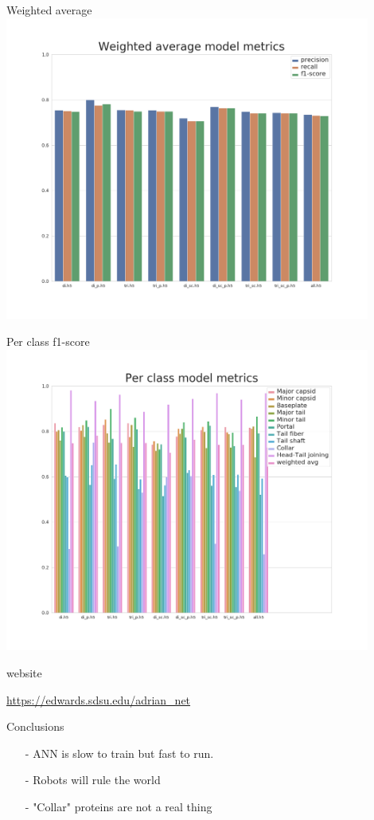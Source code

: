 \documentclass{beamer}
\begin{document}
\begin{frame}{Weighted average}
\includegraphics[width=0.90\textwidth]{avg_score}
\end{frame}

\begin{frame}{Per class f1-score}
\includegraphics[width=0.90\textwidth]{f1_score}
\end{frame}

\begin{frame}{website}
\begin{center}
\url{https://edwards.sdsu.edu/adrian_net}
\end{center}
\end{frame}

\begin{frame}{Conclusions}
\begin{itemize}
\item [-] ANN is slow to train but fast to run.
\item [-] Robots will rule the world
\item [-] "Collar" proteins are not a real thing
\end{itemize}
\end{frame}
\end{document}
